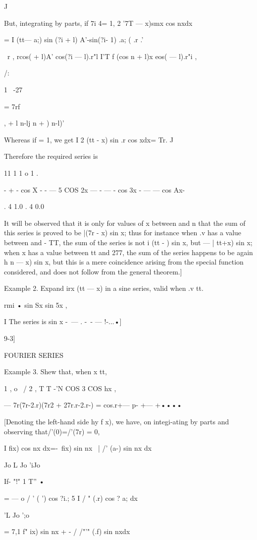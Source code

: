 J

But, integrating by parts, if 7i 4= 1, 2 '7T — x)smx cos nxdx

= I (tt— a;) sin (?i + l) A'-sin(?i- 1) .a; ( .r .'

\ r , rcos( + l)A' cos(?i — l).r"l I'T f (cos n + l)x eos( — l).r"i ,

/:

1 \ -27

= 7rf

, + l n-lj n + ) n-l)'

Whereas if = 1, we get I 2 (tt - x) sin .r cos xdx= Tr. J

Therefore the required series is

11 1 1 o 1 .

- + - cos X - - — 5 COS 2x — - — - cos 3x - — — cos Ax-

. 4 1.0 . 4 0.0

It will be observed that it is only for values of x between and n that
the sum of this series is proved to be |(7r - x) sin x; thus for
instance when .v has a value between and - TT, the sum of the series
is not i (tt - ) sin x, but — | tt+x) sin x; when x has a value
between tt and 277, the sum of the series happens to be again h n — x)
sin x, but this is a mere coincidence arising from the special
function considered, and does not follow from the general theorem.]

Example 2. Expand irx (tt — x) in a sine series, valid when .v tt.

rmi • sin Sx sin 5x ,

I The series is sin x -\ — . -\ - — !-...•]

9-3]

FOURIER SERIES

Example 3. Shew that, when x tt,

1 , o \ / 2 , T T -'N COS 3 COS hx ,

— 7r(7r-2.r)(7r2 + 27r.r-2.r-) = cos.r+— p- +— +••••

[Denoting the left-hand side hy f x), we have, on integi-ating by
parts and observing that/'(0)=/'(7r) = 0,

I fix) cos nx dx=-\ fix) sin nx \ | /' (a-) sin nx dx

Jo L Jo 'iJo

If- "!" 1 T'' •

= — o / ' ( ') cos ?i.; 5 I / " (.r) cos ? a; dx

 'L Jo ';o

= 7,1 f" ix) sin nx + - / /"'" (.f) sin nxdx


